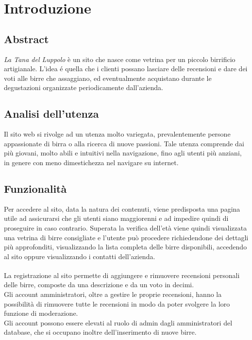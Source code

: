 \section{Introduzione}
\subsection{Abstract}
\textit{La Tana del Luppolo} è un sito che nasce come vetrina per un piccolo birrificio artigianale. L'idea é quella che i clienti possano lasciare delle recensioni e dare dei voti alle birre che assaggiano, ed eventualmente acquistano durante le degustazioni organizzate periodicamente dall'azienda.
\subsection{Analisi dell'utenza}
Il sito web si rivolge ad un utenza molto variegata, prevalentemente persone appassionate di birra o alla ricerca di nuove passioni. Tale utenza comprende dai più giovani, molto abili e intuitivi nella navigazione, fino agli utenti più anziani, in genere con meno dimestichezza nel navigare su internet.

\subsection{Funzionalità}
Per accedere al sito, data la natura dei contenuti, viene predisposta una pagina utile ad assicurarsi che gli utenti siano maggiorenni e ad impedire quindi di proseguire in caso contrario. Superata la verifica dell'età viene quindi visualizzata una vetrina di birre consigliate e l'utente può procedere richiedendone dei dettagli più approfonditi, visualizzando la lista completa delle birre disponibili, accedendo al sito oppure visualizzando i contatti dell'azienda.\\ \\
La registrazione al sito permette di aggiungere e rimuovere recensioni personali delle birre, composte da una descrizione e da un voto in decimi.\\
Gli account amministratori, oltre a gestire le proprie recensioni, hanno la possibilità di rimuovere tutte le recensioni in modo da poter svolgere la loro funzione di moderazione.\\
Gli account possono essere elevati al ruolo di admin dagli amministratori del database, che si occupano inoltre dell'inserimento di nuove birre.

